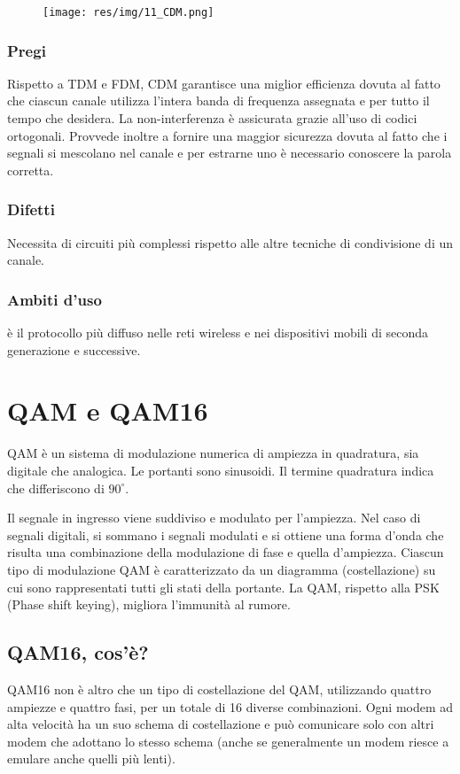 \begin{figure}[H]
\centering
\texttt{[image: res/img/11\_CDM.png]}
\end{figure}
\subsubsection{Pregi}
Rispetto a TDM e FDM, CDM garantisce una miglior efficienza dovuta al fatto che ciascun canale utilizza l'intera banda di frequenza assegnata e per tutto il tempo che desidera.
La non-interferenza è assicurata grazie all'uso di codici ortogonali.
Provvede inoltre a fornire una maggior sicurezza dovuta al fatto che i segnali si mescolano nel canale e per estrarne uno è necessario conoscere la parola corretta.
\subsubsection{Difetti}
Necessita di circuiti più complessi rispetto alle altre tecniche di condivisione di un canale.
\subsubsection{Ambiti d'uso}
è il protocollo più diffuso nelle reti wireless e nei dispositivi mobili di seconda generazione e successive.
\section{QAM e QAM16}

QAM è un sistema di modulazione numerica di ampiezza in quadratura, sia digitale che analogica. 
Le portanti sono sinusoidi. Il termine quadratura indica che differiscono di $90^{\circ}$.

Il segnale in ingresso viene suddiviso e modulato per l'ampiezza. Nel caso di segnali digitali, si sommano i segnali modulati e si ottiene una forma d'onda che risulta una combinazione della modulazione di fase e quella d'ampiezza.
Ciascun tipo di modulazione QAM è caratterizzato da un diagramma (costellazione) su cui sono rappresentati tutti gli stati della portante.
La QAM, rispetto alla PSK (Phase shift keying), migliora l'immunità al rumore. 
\subsection{QAM16, cos'è?}
QAM16 non è altro che un tipo di costellazione del QAM, utilizzando quattro ampiezze e quattro fasi, per un totale di 16 diverse combinazioni. Ogni modem ad alta velocità ha un suo schema di costellazione e può comunicare solo con altri modem che adottano lo stesso schema (anche se generalmente un modem riesce a emulare anche quelli più lenti).

